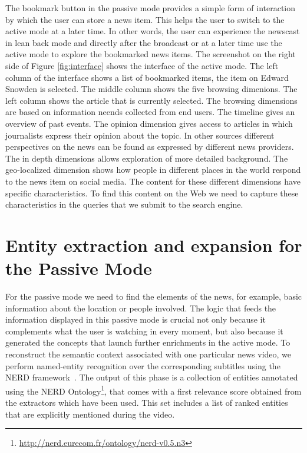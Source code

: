 \documentclass{llncs}
\begin{document}
The bookmark button in the passive mode provides a simple form of interaction by which the user can store a news item. This helps the user to switch to the active mode at a later time. In other words, the user can experience the newscast in lean back mode and directly after the broadcast or at a later time use the active mode to explore the bookmarked news items. The screenshot on the right side of Figure \ref{fig:interface} shows the interface of the active mode. The left column of the interface shows a list of bookmarked items, the item on Edward Snowden is selected. The middle column shows the five browsing dimenions. The left column shows the article that is currently selected. The browsing dimensions are based on information neends collected from end users. The timeline gives an overview of past events. The opinion dimension gives access to articles in which journalists express their opinion about the topic. In other sources different perspectives on the news can be found as expressed by different news providers. The in depth dimensions allows exploration of more detailed background. The geo-localized dimension shows how people in different places in the world respond to the news item on social media. The content for these different dimensions have specific characteristics. To find this content on the Web we need to capture these characteristics in the queries that we submit to the search engine.


\section{Entity extraction and expansion for the Passive Mode}
\label{sec:leanbackmode}

For  the passive mode we need to find the elements of the news, for example, basic information about the location or people involved. The logic that feeds the information displayed in this passive mode is crucial not only because it complements what the user is watching in every moment, but also because it generated the concepts that launch further enrichments in the active mode. To reconstruct the semantic context associated with one particular news video, we perform named-entity recognition over the corresponding subtitles using the NERD framework~\cite{Rizzo2012b}. The output of this phase is a collection of entities annotated using the NERD Ontology\footnote{\fontsize{8pt}{1em}\selectfont \url{http://nerd.eurecom.fr/ontology/nerd-v0.5.n3}}, that comes with a first relevance score obtained from the extractors which have been used. This set includes a list of ranked entities that are explicitly mentioned during the video.
\end{document}
